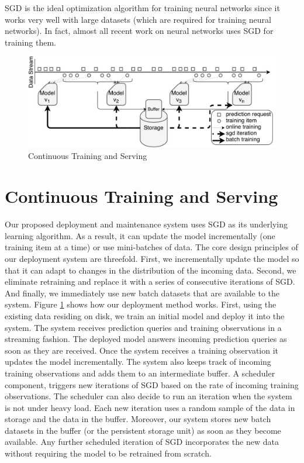 \documentclass[10pt,conference,letterpaper]{IEEEtran}
\begin{document}
SGD is the ideal optimization algorithm for training neural networks since it works very well with large datasets (which are required for training neural networks).
In fact, almost all recent work on neural networks uses SGD for training them.

\begin{figure}[t]
\centering
\includegraphics[width=\columnwidth]{../images/continuous-final.pdf}
\caption{Continuous Training and Serving}
\label{fig:cont-training-serving}
\end{figure}

\section{Continuous Training and Serving} \label{continious-training-serving}
Our proposed deployment and maintenance system uses SGD as its underlying learning algorithm.
As a result, it can update the model incrementally (one training item at a time) or use mini-batches of data.
The core design principles of our deployment system are threefold.
First, we incrementally update the model so that it can adapt to changes in the distribution of the incoming data.
Second, we eliminate retraining and replace it with a series of consecutive iterations of SGD.
And finally, we immediately use new batch datasets that are available to the system.
Figure \ref{fig:cont-training-serving} shows how our deployment method works.
First, using the existing data residing on disk, we train an initial model and deploy it into the system.
The system receives prediction queries and training observations in a streaming fashion.
The deployed model answers incoming prediction queries as soon as they are received.
Once the system receives a training observation it updates the model incrementally.
The system also keeps track of incoming training observations and adds them to an intermediate buffer.
A scheduler component, triggers new iterations of SGD based on the rate of incoming training observations. 
The scheduler can also decide to run an iteration when the system is not under heavy load.
Each new iteration uses a random sample of the data in storage and the data in the buffer. 
Moreover, our system stores new batch datasets in the buffer (or the persistent storage unit) as soon as they become available.
Any further scheduled iteration of SGD incorporates the new data without requiring the model to be retrained from scratch.
\end{document}

